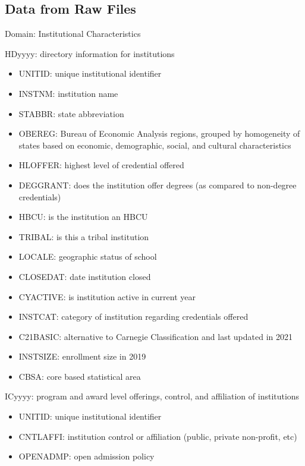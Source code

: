 \documentclass[sigconf, authorversion, nonacm]{acmart}
\begin{document}
    \subsection{Data from Raw Files}

        Domain: Institutional Characteristics

        HDyyyy: directory information for institutions

        \begin{itemize}
            \item UNITID: unique institutional identifier
            \item INSTNM: institution name
            \item STABBR: state abbreviation
            \item OBEREG: Bureau of Economic Analysis regions, grouped by homogeneity of states based on economic, demographic, social, and cultural characteristics
            \item HLOFFER: highest level of credential offered
            \item DEGGRANT: does the institution offer degrees (as compared to non-degree credentials)
            \item HBCU: is the institution an HBCU
            \item TRIBAL: is this a tribal institution
            \item LOCALE: geographic status of school
            \item CLOSEDAT: date institution closed
            \item CYACTIVE: is institution active in current year
            \item INSTCAT: category of institution regarding credentials offered
            \item C21BASIC: alternative to Carnegie Classification and last updated in 2021
            \item INSTSIZE: enrollment size in 2019
            \item CBSA: core based statistical area
        \end{itemize}

        ICyyyy: program and award level offerings, control, and affiliation of institutions

        \begin{itemize}
            \item UNITID: unique institutional identifier
            \item CNTLAFFI: institution control or affiliation (public, private non-profit, etc)
            \item OPENADMP: open admission policy
        \end{itemize}
\end{document}
